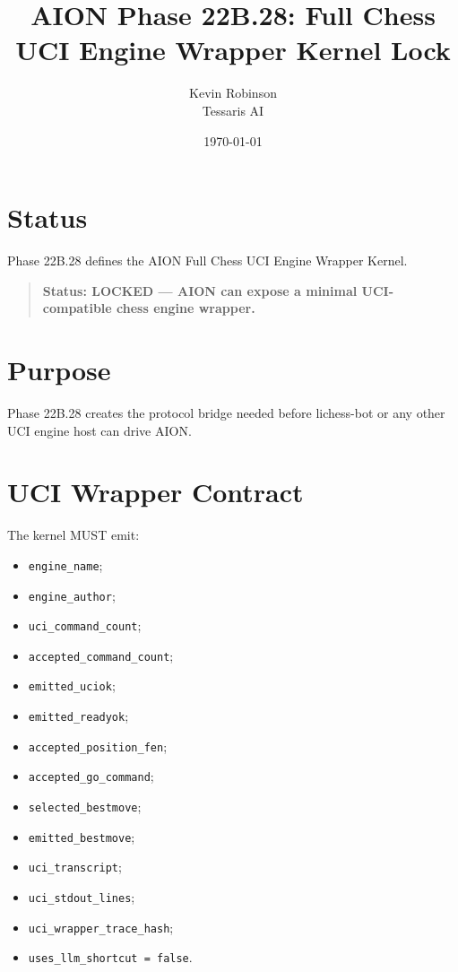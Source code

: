 \documentclass[11pt,a4paper]{article}
\title{\textbf{AION Phase 22B.28: Full Chess UCI Engine Wrapper Kernel Lock}}
\author{Kevin Robinson\\Tessaris AI}
\date{\today}
\begin{document}
\maketitle

\section{Status}

Phase 22B.28 defines the AION Full Chess UCI Engine Wrapper Kernel.

\begin{quote}
\textbf{Status: LOCKED --- AION can expose a minimal UCI-compatible chess engine wrapper.}
\end{quote}

\section{Purpose}

Phase 22B.28 creates the protocol bridge needed before lichess-bot or any other UCI engine host can drive AION.

\section{UCI Wrapper Contract}

The kernel MUST emit:

\begin{itemize}
  \item \texttt{engine\_name};
  \item \texttt{engine\_author};
  \item \texttt{uci\_command\_count};
  \item \texttt{accepted\_command\_count};
  \item \texttt{emitted\_uciok};
  \item \texttt{emitted\_readyok};
  \item \texttt{accepted\_position\_fen};
  \item \texttt{accepted\_go\_command};
  \item \texttt{selected\_bestmove};
  \item \texttt{emitted\_bestmove};
  \item \texttt{uci\_transcript};
  \item \texttt{uci\_stdout\_lines};
  \item \texttt{uci\_wrapper\_trace\_hash};
  \item \texttt{uses\_llm\_shortcut = false}.
\end{itemize}
\end{document}
